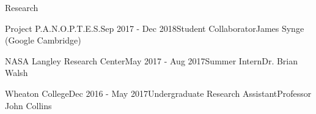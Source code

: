 \documentclass{resume} %
\begin{document}
\begin{rSection}{Research}
\begin{rSubsection}{Project P.A.N.O.P.T.E.S.}{Sep 2017 - Dec 2018}{Student Collaborator}{James Synge (Google Cambridge)}
\end{rSubsection}
\begin{rSubsection}{NASA Langley Research Center}{May 2017 - Aug 2017}{Summer Intern}{Dr. Brian Walsh}
\end{rSubsection}

\begin{rSubsection}{Wheaton College}{Dec 2016 - May 2017}{Undergraduate Research Assistant}{Professor John Collins}
\end{rSubsection}

\end{rSection}
\end{document}
